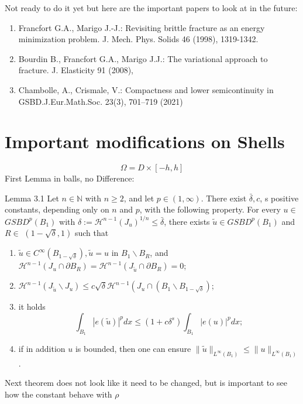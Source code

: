 \begin{com} Not ready to do it yet but here are the important papers to look at in the future:
\begin{enumerate}
\item Francfort G.A., Marigo J.-J.: Revisiting brittle fracture as an energy
minimization problem. J. Mech. Phys. Solids 46 (1998), 1319-1342.
\item Bourdin B., Francfort G.A., Marigo J.J.: The variational approach to fracture. J. Elasticity 91 (2008),
\item Chambolle, A., Crismale, V.: Compactness and lower semicontinuity in GSBD.J.Eur.Math.Soc.
23(3), 701–719 (2021)
\end{enumerate}
\end{com}
\section{Important modifications  on Shells}
$$\Omega= D\times [-h,h]$$
First Lemma in balls, no Difference:
\begin{lemma}
    Lemma 3.1 Let $n \in \mathbb{N}$ with $n \geq 2$, and let $p \in(1, \infty)$. There exist $\bar{\delta}, c$, s positive constants, depending only on $n$ and $p$, with the following property. For every $u \in$ $G S B D^p\left(B_1\right)$ with $\delta:=\mathcal{H}^{n-1}\left(J_u\right)^{1 / n} \leq \bar{\delta}$, there exists $\tilde{u} \in G S B D^p\left(B_1\right)$ and $R \in$ $(1-\sqrt{\delta}, 1)$ such that
    \begin{enumerate}
\item $\tilde{u} \in C^{\infty}\left(B_{1-\sqrt{\delta}}\right), \tilde{u}=u$ in $B_1 \backslash B_R$, and $\mathcal{H}^{n-1}\left(J_u \cap \partial B_R\right)=\mathcal{H}^{n-1}\left(J_{\tilde{u}} \cap \partial B_R\right)=0$;
\item $\mathcal{H}^{n-1}\left(J_{\tilde{u}} \backslash J_u\right) \leq c \sqrt{\delta} \mathcal{H}^{n-1}\left(J_u \cap\left(B_1 \backslash B_{1-\sqrt{\delta}}\right)\right.$;
\item it holds
$$
\int_{B_1}|e(\tilde{u})|^p d x \leq\left(1+c \delta^s\right) \int_{B_1}|e(u)|^p d x ;
$$
\item if in addition $u$ is bounded, then one can ensure $\|\tilde{u}\|_{L^{\infty}\left(B_1\right)} \leq\|u\|_{L^{\infty}\left(B_1\right)}$.
\end{enumerate}
\end{lemma}
Next theorem does not look like it need to be changed, but is important to see how the constant behave with $\rho$
